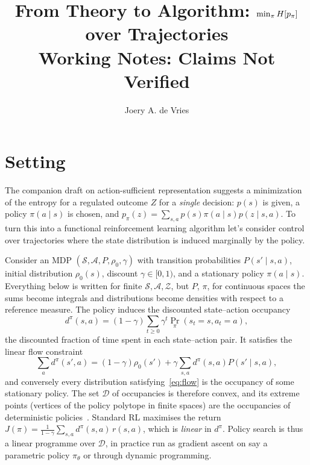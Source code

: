 \documentclass[11pt]{article}
\title{From Theory to Algorithm: $\min_\pi H\!\left[p_\pi\right]$ over Trajectories\\
\Large \textbf{Working Notes: Claims Not Verified}}
\author{Joery A. de Vries}
\theoremstyle{remark}
\newcommand{\Acal}{\mathcal A}
\newcommand{\Scal}{\mathcal S}
\newcommand{\Zcal}{\mathcal Z}
\newcommand{\Dcal}{\mathcal D}
\newcommand{\1}{\mathds{1}}
\newcommand{\occ}{d^{\pi}}
\newcommand{\pz}{p_{\pi}}
\begin{document}
\maketitle

\section{Setting}

The companion draft on action-sufficient representation suggests a minimization of the entropy for a regulated outcome $Z$ for a \emph{single} decision: $p(s)$ is given, a policy $\pi(a\mid s)$ is chosen, and $\pz(z)=\sum_{s,a}p(s)\pi(a\mid s)p(z\mid s,a)$.
To turn this into a functional reinforcement learning algorithm let's consider control over trajectories where the state distribution is induced marginally by the policy.

Consider an MDP $(\Scal,\Acal,P,\rho_0,\gamma)$ with transition probabilities $P(s'\mid s,a)$, initial distribution $\rho_0(s)$, discount $\gamma\in[0,1)$, and a stationary policy $\pi(a\mid s)$.
Everything below is written for finite $\Scal,\Acal,\Zcal$, but $P$, $\pi$, for continuous spaces the sums become integrals and distributions become densities with respect to a reference measure.
The policy induces the discounted state--action occupancy
\begin{equation}
  \occ(s,a)=(1-\gamma)\sum_{t\ge0}\gamma^t\Pr_\pi(s_t=s,a_t=a),
  \label{eq:occ}
\end{equation}
the discounted fraction of time spent in each state--action pair.
It satisfies the linear flow constraint
\begin{equation}
  \sum_a \occ(s',a)=(1-\gamma)\rho_0(s')+\gamma\sum_{s,a}\occ(s,a)P(s'\mid s,a),
  \label{eq:flow}
\end{equation}
and conversely every distribution satisfying~\eqref{eq:flow} is the occupancy of some stationary policy.
The set $\Dcal$ of occupancies is therefore convex, and its extreme points (vertices of the policy polytope in finite spaces) are the occupancies of deterministic policies~\citep{Puterman-markov94}.
Standard RL maximises the return $J(\pi)=\tfrac{1}{1-\gamma}\sum_{s,a}\occ(s,a)\,r(s,a)$, which is \emph{linear} in $\occ$.
Policy search is thus a linear programme over $\Dcal$, in practice run as gradient ascent on say a parametric policy $\pi_\theta$ or through dynamic programming.
\end{document}
